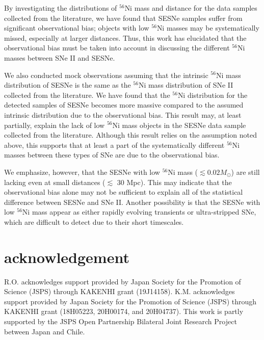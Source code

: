 \documentclass[twocolumn, linenumbers]{aastex62}
\begin{document}
By investigating the distributions of $^{56}$Ni mass and distance for the data samples collected from the literature, we have found that SESNe samples suffer from significant observational bias; objects with low $^{56}$Ni masses may be systematically missed, especially at larger distances. 
Thus, this work has elucidated that the observational bias must be taken into account in discussing the different $^{56}$Ni masses between SNe II and SESNe.

We also conducted mock observations assuming that the intrinsic $^{56}$Ni mass distribution of SESNe is the same as the $^{56}$Ni mass distribution of SNe II collected from the literature. We have found that the $^{56}$Ni distribution for the detected samples of SESNe becomes more massive compared to the assumed intrinsic distribution due to the observational bias. This result may, at least partially, explain the lack of low $^{56}$Ni mass objects in the SESNe data sample collected from the literature. Although this result relies on the assumption noted above, this supports that at least a part of the  systematically different $^{56}$Ni masses between these types of SNe are due to the observational bias. 

We emphasize, however, that the SESNe with low $^{56}$Ni mass ($\lesssim 0.02 M_{\odot}$) are still lacking even at small distances ($\lesssim$ 30 Mpc). This may indicate that the observational bias alone may not be sufficient to explain all of the statistical difference between SESNe and SNe II. Another possibility is that the SESNe with low $^{56}$Ni mass appear as either rapidly evolving transients or ultra-stripped SNe, which are difficult to detect due to their short timescales.

\section{acknowledgement}
R.O. acknowledges support provided by Japan Society for the Promotion of Science (JSPS) through KAKENHI grant (19J14158).
K.M. acknowledges support provided by Japan Society for the Promotion of Science (JSPS) through KAKENHI grant (18H05223, 20H00174, and 20H04737). This work is partly supported by the JSPS Open Partnership Bilateral Joint Research Project between Japan and Chile. 
\end{document}
